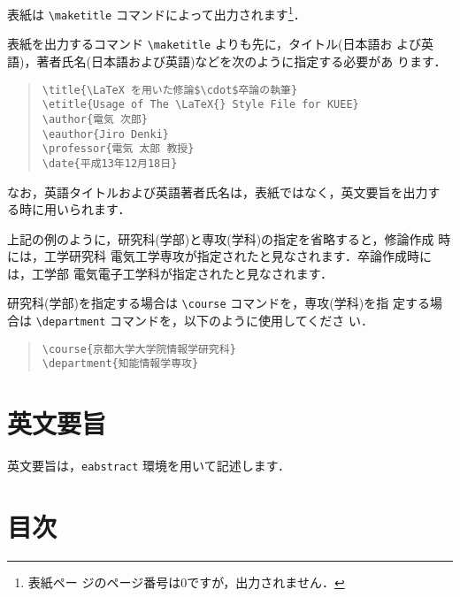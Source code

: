 \documentclass[
  sotsuron]{kuee}
\begin{document}
表紙は \verb+\maketitle+ コマンドによって出力されます\footnote{表紙ペー
  ジのページ番号は0ですが，出力されません．}．

表紙を出力するコマンド \verb+\maketitle+ よりも先に，タイトル(日本語お
よび英語)，著者氏名(日本語および英語)などを次のように指定する必要があ
ります．

\begin{quote}
  \begin{verbatim}
\title{\LaTeX を用いた修論$\cdot$卒論の執筆}
\etitle{Usage of The \LaTeX{} Style File for KUEE}
\author{電気 次郎}
\eauthor{Jiro Denki}
\professor{電気 太郎 教授}
\date{平成13年12月18日}
\end{verbatim}
\end{quote}

なお，英語タイトルおよび英語著者氏名は，表紙ではなく，英文要旨を出力す
る時に用いられます．

上記の例のように，研究科(学部)と専攻(学科)の指定を省略すると，修論作成
時には，工学研究科 電気工学専攻が指定されたと見なされます．卒論作成時に
は，工学部 電気電子工学科が指定されたと見なされます．

研究科(学部)を指定する場合は \verb+\course+ コマンドを，専攻(学科)を指
定する場合は \verb+\department+ コマンドを，以下のように使用してくださ
い．

\begin{quote}
  \begin{verbatim}
\course{京都大学大学院情報学研究科}
\department{知能情報学専攻}
\end{verbatim}
\end{quote}

\hypertarget{ux82f1ux6587ux8981ux65e8}{%
\section{英文要旨}\label{ux82f1ux6587ux8981ux65e8}}

英文要旨は，\verb+eabstract+ 環境を用いて記述します．

\hypertarget{ux76eeux6b21}{%
\section{目次}\label{ux76eeux6b21}}
\end{document}
